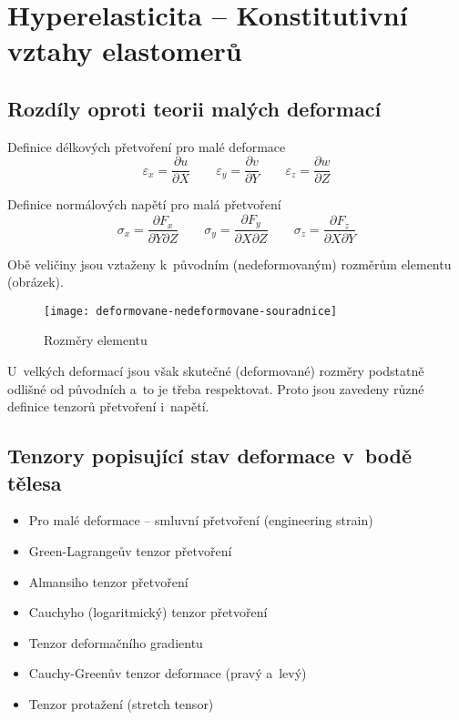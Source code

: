 
\section{Hyperelasticita -- Konstitutivní vztahy elastomerů}
\subsection{Rozdíly oproti teorii malých deformací}

Definice délkových přetvoření pro malé deformace
\begin{equation}\label{pretvoreni_male_deformace}
	\varepsilon_x = \frac{\partial u}{\partial X}
	\qquad
	\varepsilon_y = \frac{\partial v}{\partial Y}
	\qquad
	\varepsilon_z = \frac{\partial w}{\partial Z}
\end{equation}

Definice normálových napětí pro malá přetvoření
\begin{equation}\label{napeti_male_deformace}
	\sigma_x = \frac{\partial F_x}{\partial Y \partial Z}
	\qquad
	\sigma_y = \frac{\partial F_y}{\partial X \partial Z}
	\qquad
	\sigma_z = \frac{\partial F_z}{\partial X \partial Y}
\end{equation}

Obě veličiny jsou vztaženy k~původním (nedeformovaným) rozměrům elementu (obrázek).
\begin{figure}[H]
	\centering
	\texttt{[image: deformovane-nedeformovane-souradnice]}
	\caption{Rozměry elementu}
\end{figure}

U~velkých deformací jsou však skutečné (deformované) rozměry podstatně odlišné od původních a~to je třeba respektovat.
Proto jsou zavedeny různé definice tenzorů přetvoření i~napětí.

\subsection{Tenzory popisující stav deformace v~bodě tělesa}
\begin{itemize}
	\item Pro malé deformace -- smluvní přetvoření (engineering strain)
	\item Green-Lagrangeův tenzor přetvoření
	\item Almansiho tenzor přetvoření
	\item Cauchyho (logaritmický) tenzor přetvoření
	\item Tenzor deformačního gradientu
	\item Cauchy-Greenův tenzor deformace (pravý a~levý)
	\item Tenzor protažení (stretch tensor)
\end{itemize}


